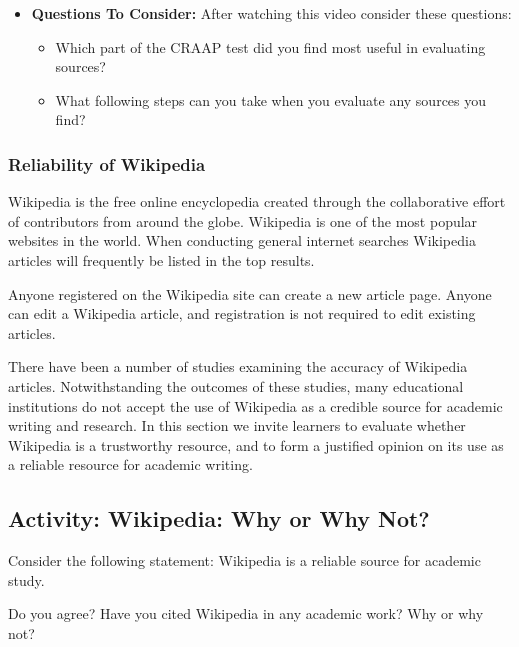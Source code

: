 \documentclass[
  letterpaper,
  DIV=11,
  numbers=noendperiod]{scrreprt}
\providecommand{\tightlist}{%
  \setlength{\itemsep}{0pt}\setlength{\parskip}{0pt}}\usepackage{longtable,booktabs,array}
\begin{document}
\begin{tcolorbox}
\begin{itemize}
\tightlist
\item
  \textbf{Questions To Consider:} After watching this video consider
  these questions:

  \begin{itemize}
  \tightlist
  \item
    Which part of the CRAAP test did you find most useful in evaluating
    sources?
  \item
    What following steps can you take when you evaluate any sources you
    find?
  \end{itemize}
\end{itemize}

\end{tcolorbox}

\subsubsection*{Reliability of
Wikipedia}\label{reliability-of-wikipedia}

Wikipedia is the free online encyclopedia created through the
collaborative effort of contributors from around the globe. Wikipedia is
one of the most popular websites in the world. When conducting general
internet searches Wikipedia articles will frequently be listed in the
top results.

Anyone registered on the Wikipedia site can create a new article page.
Anyone can edit a Wikipedia article, and registration is not required to
edit existing articles.

There have been a number of studies examining the accuracy of Wikipedia
articles. Notwithstanding the outcomes of these studies, many
educational institutions do not accept the use of Wikipedia as a
credible source for academic writing and research. In this section we
invite learners to evaluate whether Wikipedia is a trustworthy resource,
and to form a justified opinion on its use as a reliable resource for
academic writing.

\subsection{Activity: Wikipedia: Why or Why
Not?}\label{activity-wikipedia-why-or-why-not}

Consider the following statement: Wikipedia is a reliable source for
academic study.

Do you agree? Have you cited Wikipedia in any academic work? Why or why
not?
\end{document}
